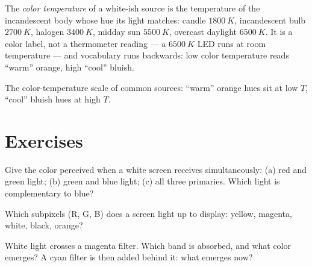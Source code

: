 \begin{definition}\label{def:g11:color-light-sources:colortemp}
The \emph{color temperature} of a white-ish
source is the temperature of the incandescent body whose hue its light
matches: candle $\qty{1800}{K}$, incandescent bulb $\qty{2700}{K}$,
halogen $\qty{3400}{K}$, midday sun $\qty{5500}{K}$, overcast daylight
$\qty{6500}{K}$. It is a color label, not a thermometer reading --- a
$\qty{6500}{K}$ LED runs at room temperature --- and vocabulary runs
backwards: low color temperature reads ``warm'' orange, high ``cool''
bluish.
\end{definition}

\begin{omfigure}

{\small The color-temperature scale of common sources: ``warm'' orange
hues sit at low $T$, ``cool'' bluish hues at high $T$.}
\end{omfigure}

\section{Exercises}

\begin{exercise}[$\star$]\label{exo:g11:color-light-sources:1}
Give the color perceived when a white screen receives simultaneously:
(a) red and green light; (b) green and blue light; (c) all three
primaries. Which light is complementary to blue?
\end{exercise}

\begin{exercise}[$\star$]\label{exo:g11:color-light-sources:2}
Which subpixels (R, G, B) does a screen light up to display: yellow,
magenta, white, black, orange?
\end{exercise}

\begin{exercise}[$\star$]\label{exo:g11:color-light-sources:3}
White light crosses a magenta filter. Which band is absorbed, and what
color emerges? A cyan filter is then added behind it: what emerges now?
\end{exercise}

